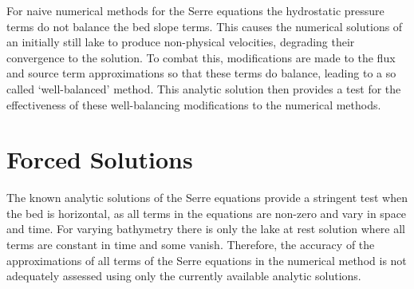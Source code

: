 For naive numerical methods for the Serre equations the hydrostatic pressure terms do not balance the bed slope terms. This causes the numerical solutions of an initially still lake to produce non-physical velocities, degrading their convergence to the solution. To combat this, modifications are made to the flux and source term approximations so that these terms do balance, leading to a so called `well-balanced' method. This analytic solution then provides a test for the effectiveness of these well-balancing modifications to the numerical methods.


\section{Forced Solutions}
The known analytic solutions of the Serre equations provide a stringent test when the bed is horizontal, as all terms in the equations are non-zero and vary in space and time. For varying bathymetry there is only the lake at rest solution where all terms are constant in time and some vanish. Therefore, the accuracy of the approximations of all terms of the Serre equations in the numerical method is not adequately assessed using only the currently available analytic solutions.

